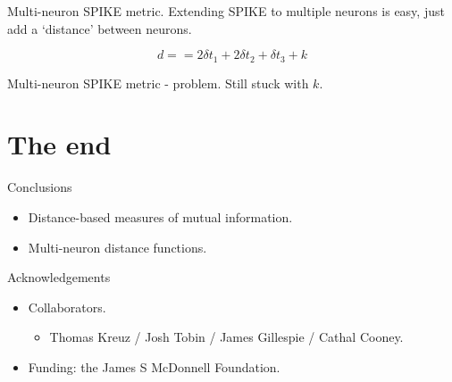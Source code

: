 \documentclass{beamer}
\begin{document}
\begin{frame}{Multi-neuron SPIKE metric.}
Extending SPIKE to multiple neurons is easy, just add a \lq{}distance\rq{} between neurons.
\color{reddish}

\color{dark}
$$
d==2\delta t_1+2\delta t_2+\delta t_3+k
$$
\end{frame}

\begin{frame}{Multi-neuron SPIKE metric - problem.}
Still stuck with \color{dark}$k$\color{black}.
\end{frame}

\section{The end}

\begin{frame}{Conclusions}
\begin{itemize}
\item Distance-based measures of mutual information.
\item Multi-neuron distance functions.
\end{itemize}
\end{frame}

\begin{frame}{Acknowledgements}
\begin{itemize}
\item Collaborators.
\begin{itemize}
\item Thomas Kreuz / Josh Tobin / James Gillespie / Cathal Cooney.
\end{itemize}
\item Funding: the James S McDonnell Foundation.
\end{itemize}
\end{frame}
\end{document}
